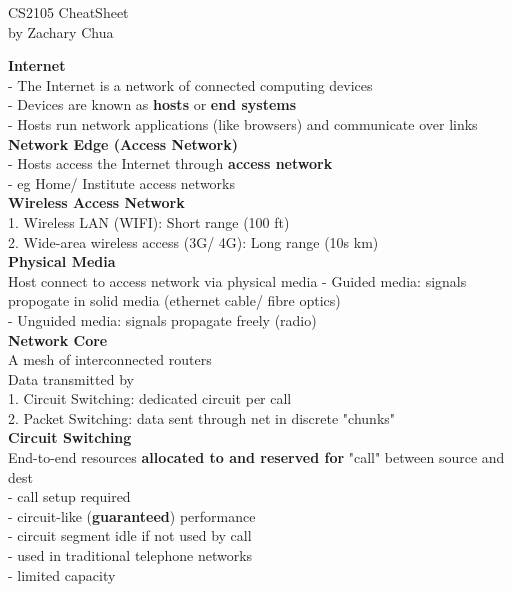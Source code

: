 \documentclass[10pt, a4paper]{article}
\author{Zachary Chua Yan Ern}
\date{22 September 2021}
\newcommand{\highlight}[1]{{\color{red}\textbf{#1}}}
\begin{document}
	\scriptsize %
	\setlength\parindent{0pt}
	\setlength{\columnseprule}{0.1pt}
	
	\begin{center}
		{\large CS2105 CheatSheet}\\
		by Zachary Chua
	\end{center}
	
	\begin{multicols*}{3}
		{\normalsize\textbf{Internet}}\\
		- The Internet is a network of connected computing devices\\
		- Devices are known as \highlight{hosts} or \highlight{end systems}\\
		- Hosts run network applications (like browsers) and communicate over links\\
		
		\textbf{Network Edge (Access Network)}\\
		- Hosts access the Internet through \highlight{access network}\\
		- eg Home/ Institute access networks\\
		
		\textbf{Wireless Access Network}\\
		1. Wireless LAN (WIFI): Short range (100 ft)\\
		2. Wide-area wireless access (3G/ 4G): Long range (10s km)\\	
		
		\textbf{Physical Media}\\
		Host connect to access network via physical media
		- Guided media: signals propogate in solid media (ethernet cable/ fibre optics)\\
		- Unguided media: signals propagate freely (radio)\\
		
		\textbf{Network Core}\\
		A mesh of interconnected routers\\
		Data transmitted by\\
		1. Circuit Switching: dedicated circuit per call\\
		2. Packet Switching: data sent through net in discrete "chunks"\\
		
		\textbf{Circuit Switching}\\
		End-to-end resources \highlight{allocated to and reserved for} "call" between source and dest\\
		- call setup required\\
		- circuit-like (\highlight{guaranteed}) performance\\
		- circuit segment idle if not used by call\\
		- used in traditional telephone networks\\
		- limited capacity\\
		

\end{multicols*}
\end{document}
